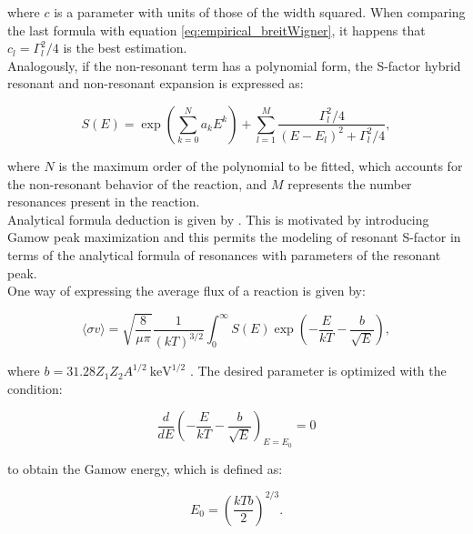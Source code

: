\documentclass[openany]{book}
\begin{document}
where $c$ is a parameter with units of those of the width squared. When comparing the last formula with equation \ref{eq:empirical_breitWigner}, it happens that $c_l = \Gamma^2_l/4$ is the best estimation. \\

Analogously, if the non-resonant term has a polynomial form, the S-factor hybrid resonant and non-resonant expansion is expressed as:

\begin{equation}  \label{eq:empirical_hybridExponential}
	S(E) =  \exp { \left( \sum _{k = 0}^{N} {a_kE^k} \right) } + \sum_{l = 1}^{M} {\frac{\Gamma_l^2/4}{(E - E_l)^2 + \Gamma_l^2/4}},
\end{equation}

where $N$ is the maximum order of the polynomial to be fitted, which accounts for the non-resonant behavior of the reaction, and $M$ represents the number resonances present in the reaction.  \\

Analytical formula deduction is given by \cite{kimura_bonasera_2013}. This is motivated by introducing Gamow peak maximization and this permits the modeling of resonant S-factor in terms of the analytical formula of resonances with parameters of the resonant peak. \\

One way of expressing the average flux of a reaction is given by: 

\begin{equation}\label{eq:potential_sfactor_flux}
	\langle \sigma v \rangle = \sqrt{\frac{8}{\mu \pi}} \frac{1}{(kT)^{3/2}} \int_0^{\infty} S(E) \exp {\left( - \frac{E}{kT} - \frac{b}{\sqrt E} \right) },
\end{equation}

where $b = 31.28Z_1Z_2A^{1/2} \ \mathrm{keV^{1/2}}$ . The desired parameter is optimized with the condition:

\begin{equation}\label{eq:potential_sfactor_condition}
	\frac{d}{dE} \left(- \frac{E}{kT} - \frac{b}{\sqrt{E}}\right)_{E = E_0} = 0
\end{equation}

to obtain the Gamow energy, which is defined as: 

\begin{equation}\label{eq:potential_sfactor_gamowEnergy}
	E_0 = \left(\frac{kTb}{2}\right)^{2/3}.
\end{equation}
\end{document}
